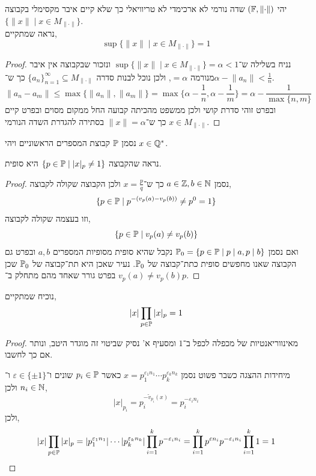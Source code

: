 \question{}

יהי $(\mathbb{F}, \lVert \cdot \rVert)$ שדה נורמי לא ארכימדי לא טריוויאלי כך שלא קיים איבר מקסימלי בקבוצה $\{ \lVert x \rVert \mid x \in M_{\lVert \cdot \rVert} \}$. \\
נראה שמתקיים,
\[
	\sup\{ \lVert x \rVert \mid x \in M_{\lVert \cdot \rVert} \} = 1
\]
\begin{proof}
	נניח בשלילה ש־$\sup\{ \lVert x \rVert \mid x \in M_{\lVert \cdot \rVert} \} = \alpha < 1$ ונזכור שבקבוצה אין איבר מנורמה $= \alpha$,
	ולכן נוכל לבנות סדרה ${\{ a_n \}}_{n = 1}^\infty \subseteq M_{\lVert \cdot \rVert}$ כך ש־$\alpha - \lVert a_n \rVert < \frac{1}{n}$.
	\[
		\lVert a_n - a_m \rVert
		\le \max\{ \lVert a_n \rVert, \lVert a_m \rVert \}
		= \max\{ \alpha - \frac{1}{n}, \alpha - \frac{1}{m} \}
		= \alpha - \frac{1}{\max\{n, m\}}
	\]
	ובפרט זוהי סדרת קושי ולכן ממשפט מהכיתה קבועה החל ממקום מסוים ובפרט קיים $x \in M_{\lVert \cdot \rVert}$ כך ש־$\lVert x \rVert = \alpha$ בסתירה להגדרת השדה הנורמי.
\end{proof}

\question{}
נסמן $\mathbb{P}$ קבוצת המספרים הראשוניים ויהי $x \in \mathbb{Q}^*$.

\subquestion{}
נראה שהקבוצה $\{ p \in \mathbb{P} \mid |x|_p \ne 1 \}$ היא סופית.
\begin{proof}
	נסמן $a \in \mathbb{Z}, b \in \mathbb{N}$ כך ש־$x = \frac{p}{q}$ ולכן הקבוצה שקולה לקבוצה,
	\[
		\{ p \in \mathbb{P} \mid p^{-(v_p(a) - v_p(b))} \ne p^0 = 1 \}
	\]
	וזו בעצמה שקולה לקבוצה,
	\[
		\{ p \in \mathbb{P} \mid v_p(a) \ne v_p(b) \}
	\]
	ואם נסמן $\mathbb{P}_0 = \{ p \in \mathbb{P} \mid p \mid a, p \mid b \}$ נקבל שהיא סופית מסופיות המספרים $a, b$ ובפרט גם הקבוצה שאנו מחפשים סופית כתת־קבוצה של $\mathbb{P}_0$.
	נעיר שאכן היא תת־קבוצה של $\mathbb{P}_0$ שכן $v_p(a) \ne v_p(b)$ בפרט גורר שאחד מהם מתחלק ב־$p$.
\end{proof}

\subquestion{}
נוכיח שמתקיים,
\[
	|x| \prod_{p \in \mathbb{P}} |x|_p = 1
\]
\begin{proof}
	מאינווריאנטיות של מכפלה לכפל ב־$1$ ומסעיף א' נסיק שביטוי זה מוגדר היטב, ונותר אם כך לחשבו.

	מיחידות ההצגה כשבר פשוט נסמן $x = p_1^{\varepsilon_1 n_1} \cdots p_k^{\varepsilon_k n_k}$ כאשר $p_i \in \mathbb{P}$ שונים ו־$\varepsilon \in \{ \pm 1 \}$ ו־$n_i \in \mathbb{N}$ ולכן,
	\[
		| x |_{p_i}
		= p_i^{- \tilde{v}_{p_i}(x)}
		= p_i^{- \varepsilon_i n_i}
	\]
	ולכן,
	\[
		|x| \prod_{p \in \mathbb{P}} |x|_p
		= |p_1^{\varepsilon_1 n_1}| \cdots |p_k^{\varepsilon_k n_k}| \prod_{i = 1}^k p^{-\varepsilon_i n_i}
		= \prod_{i = 1}^k p^{\varepsilon n_i} p^{-\varepsilon_i n_i}
		\prod_{i = 1}^k 1
		= 1
	\]
\end{proof}

